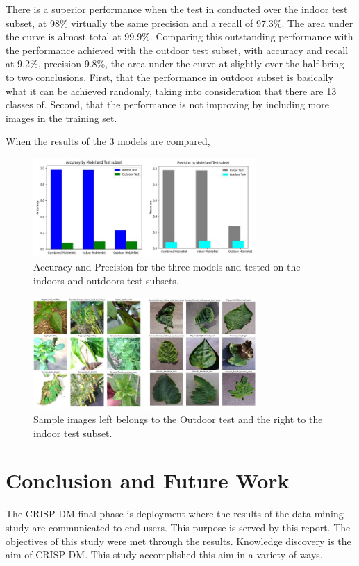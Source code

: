 \documentclass[conference]{IEEEtran}
\begin{document}
There is a superior performance when the test in conducted over the indoor test subset, at 98\% virtually the same precision and a recall of 97.3\%. The area under the curve is almost total at 99.9\%. Comparing this outstanding performance with the performance achieved with the outdoor test subset, with accuracy and recall at 9.2\%, precision 9.8\%, the area under the curve at slightly over the half bring to two conclusions. First, that the performance in outdoor subset is basically what it can be achieved randomly, taking into consideration that there are 13 classes of. Second, that the performance is not improving by including more images in the training set. 

When the results of the 3 models are compared, 

\begin{figure}[htbp]
\centerline{\includegraphics[width=8.5cm]{resultsPrecAccdifferentTests.png}}
\caption{Accuracy and Precision for the three models and tested on the indoors and outdoors test subsets.}
\label{fig}
\end{figure}


\begin{figure}[htbp]
\centerline{\includegraphics[width=8.5cm]{sampleimages.png}}
\caption{Sample images left belongs to the Outdoor test and the right to the indoor test subset.}
\label{fig}
\end{figure}

\section{Conclusion and Future Work}
The CRISP-DM final phase is deployment where the results of the data mining study are communicated to end users. This purpose is served by this report. The objectives of this study were met through the results. Knowledge discovery is the aim of CRISP-DM. This study accomplished this aim in a variety of ways. 
\end{document}
